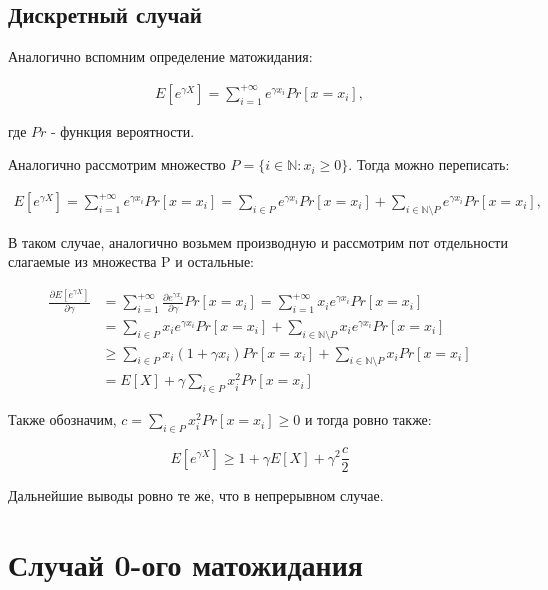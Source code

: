 \documentclass[12pt, a4paper]{article}
\theoremstyle{remark}
\begin{document}
\subsection*{Дискретный случай}

Аналогично вспомним определение матожидания:

\begin{align*}
    E[e^{\gamma X}] = \sum_{i = 1}^{+\infty} e^{\gamma x_i} Pr[x = x_i],
\end{align*}

где $Pr$ - функция вероятности.

\hfill

Аналогично рассмотрим множество $P = \{i \in \mathbb{N}: x_i \geq 0\}$. Тогда можно переписать: 

\begin{align*}
    E[e^{\gamma X}] = \sum_{i = 1}^{+\infty} e^{\gamma x_i} Pr[x = x_i] = \sum_{i \in P} e^{\gamma x_i} Pr[x = x_i] + \sum_{i \in \mathbb{N}\setminus P} e^{\gamma x_i} Pr[x = x_i],
\end{align*}

В таком случае, аналогично возьмем производную и рассмотрим пот отдельности слагаемые из множества P и остальные:

\begin{align*}
    \frac{\partial E[e^{\gamma X}]}{\partial \gamma} &= \sum_{i = 1}^{+\infty} \frac{\partial e^{\gamma x_i}}{\partial \gamma} Pr[x = x_i] = \sum_{i = 1}^{+\infty} x_i e^{\gamma x_i} Pr[x = x_i] \\
    &= \sum_{i \in P} x_i e^{\gamma x_i} Pr[x = x_i] + \sum_{i \in \mathbb{N}\setminus P} x_i e^{\gamma x_i} Pr[x = x_i] \\
    &\geq \sum_{i \in P} x_i (1 + {\gamma x_i}) Pr[x = x_i] + \sum_{i \in \mathbb{N}\setminus P} x_i Pr[x = x_i] \\
    &= E[X] + \gamma\sum_{i \in P} x_i^2 Pr[x = x_i]
\end{align*}

Также обозначим, $c = \sum_{i \in P} x_i^2 Pr[x = x_i] \geq 0$ и тогда ровно также: 

\[
E[e^{\gamma X}] \geq 1 + \gamma E[X] + \gamma^2 \frac{c}{2}  
\]

Дальнейшие выводы ровно те же, что в непрерывном случае.

\section*{Случай 0-ого матожидания}
\label{sec:zero}
\end{document}
